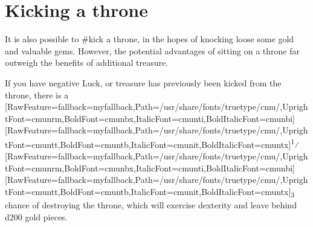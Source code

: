 \section{Kicking a throne}
\label{4}
It is also possible to \#kick\footnotemark[89] a throne, in the hopes of knocking loose some gold\footnotemark[90] and valuable gems\footnotemark[91]. However, the potential advantages of sitting on a throne far outweigh the benefits of additional treasure.


If you have negative Luck, or treasure has previously been kicked from the throne, there is a \allowbreak{}\setmainfont{cmunrm.ttf}[RawFeature={fallback=myfallback},Path=/usr/share/fonts/truetype/cmu/,UprightFont=cmunrm,BoldFont=cmunbx,ItalicFont=cmunti,BoldItalicFont=cmunbi]\setmonofont{cmunrm.ttf}[RawFeature={fallback=myfallback},Path=/usr/share/fonts/truetype/cmu/,UprightFont=cmuntt,BoldFont=cmuntb,ItalicFont=cmunit,BoldItalicFont=cmuntx]\textsuperscript{1}⁄\allowbreak{}\setmainfont{cmunrm.ttf}[RawFeature={fallback=myfallback},Path=/usr/share/fonts/truetype/cmu/,UprightFont=cmunrm,BoldFont=cmunbx,ItalicFont=cmunti,BoldItalicFont=cmunbi]\setmonofont{cmunrm.ttf}[RawFeature={fallback=myfallback},Path=/usr/share/fonts/truetype/cmu/,UprightFont=cmuntt,BoldFont=cmuntb,ItalicFont=cmunit,BoldItalicFont=cmuntx]\textsubscript{3} chance of destroying the throne, which will exercise\footnotemark[92] dexterity\footnotemark[93] and leave behind d200 gold pieces.




